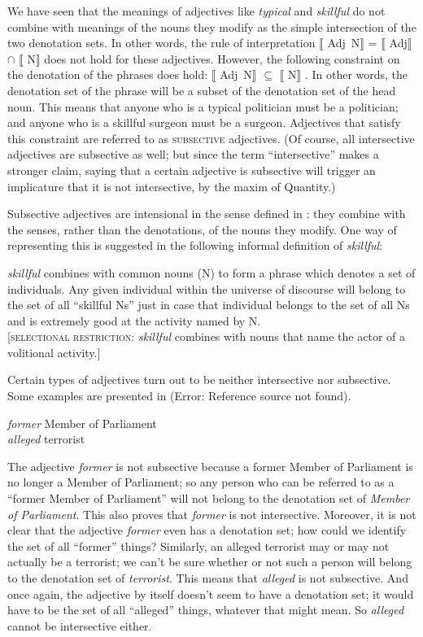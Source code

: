 We have seen that the meanings of adjectives like \textit{typical} and \textit{skillful} do not combine with meanings of the nouns they modify as the simple intersection of the two denotation sets. In other words, the rule of interpretation $\llbracket$ Adj~N$\rrbracket$  = $\llbracket$ Adj$\rrbracket$  ${\cap}$ $\llbracket$ N$\rrbracket$  does not hold for these adjectives. However, the following constraint on the denotation of the phrases does hold: $\llbracket$ Adj~N$\rrbracket$  ${\subseteq}$ $\llbracket$ N$\rrbracket$ . In other words, the denotation set of the phrase will be a subset of the denotation set of the head noun. This means that anyone who is a typical politician must be a politician; and anyone who is a skillful surgeon must be a surgeon. Adjectives that satisfy this constraint are referred to as \textsc{subsective} adjectives. (Of course, all intersective adjectives are subsective as well; but since the term “intersective” makes a stronger claim, saying that a certain adjective is subsective will trigger an implicature that it is not intersective, by the maxim of Quantity.)



Subsective adjectives are intensional in the sense defined in : they combine with the senses, rather than the denotations, of the nouns they modify. One way of representing this is suggested in the following informal definition of \textit{skillful}:


\ea \label{ex:15.9}
\textit{skillful} combines with common nouns (N) to form a phrase which denotes a set of individuals. Any given individual within the universe of discourse will belong to the set of all “skillful Ns” just in case that individual belongs to the set of all Ns and is extremely good at the activity named by N.\\
{}[\textsc{selectional restriction}: \textit{skillful} combines with nouns that name the actor of a volitional activity.]
\z


Certain types of adjectives turn out to be neither intersective nor subsective. Some examples are presented in (Error: Reference source not found).


\ea \label{ex:15.10}
\ea  \textit{former} Member of Parliament\\
\ex \textit{alleged} terrorist
\z \z


The adjective \textit{former} is not subsective because a former Member of Parliament is no longer a Member of Parliament; so any person who can be referred to as a “former Member of Parliament” will not belong to the denotation set of \textit{Member of Parliament}. This also proves that \textit{former} is not intersective. Moreover, it is not clear that the adjective \textit{former} even has a denotation set; how could we identify the set of all “former” things? Similarly, an alleged terrorist may or may not actually be a terrorist; we can’t be sure whether or not such a person will belong to the denotation set of \textit{terrorist}. This means that \textit{alleged} is not subsective. And once again, the adjective by itself doesn’t seem to have a denotation set; it would have to be the set of all “alleged” things, whatever that might mean. So \textit{alleged} cannot be intersective either.



